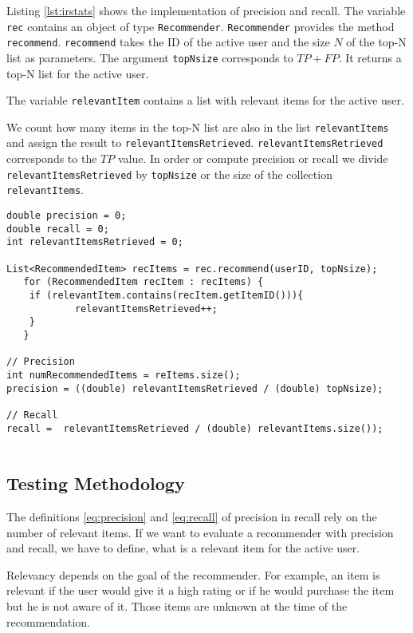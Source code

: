 Listing \ref{lst:irstats} shows the implementation of precision and recall. 
The variable \verb|rec| contains an object of type \verb|Recommender|. \verb|Recommender| provides the method \verb|recommend|. \verb|recommend| takes the ID of the active user and the size $N$ of the top-N list as parameters. The argument \verb|topNsize| corresponds to $TP+FP$. It returns a top-N list for the active user. 

The variable \verb|relevantItem| contains a list with relevant items for the active user.

We count how many items in the top-N list are also in the list \verb|relevantItems| and assign the result to \verb|relevantItemsRetrieved|. \verb|relevantItemsRetrieved| corresponds to the $TP$ value. In order or compute precision or recall we divide \verb|relevantItemsRetrieved| by \verb|topNsize| or the size of the collection\\ \verb|relevantItems|.


\begin{lstlisting}[caption=Implementation of precision and recall,label=lst:irstats]
double precision = 0;
double recall = 0;
int relevantItemsRetrieved = 0;

List<RecommendedItem> recItems = rec.recommend(userID, topNsize);
   for (RecommendedItem recItem : recItems) {
	if (relevantItem.contains(recItem.getItemID())){
			relevantItemsRetrieved++;
	}
   }

// Precision
int numRecommendedItems = reItems.size();
precision = ((double) relevantItemsRetrieved / (double) topNsize);
		      
// Recall
recall =  relevantItemsRetrieved / (double) relevantItems.size());
		      
\end{lstlisting}

\subsection{Testing Methodology}
\label{sec:methodology}
The definitions \ref{eq:precision} and \ref{eq:recall} of precision in recall rely on the number of relevant items.
If we want to evaluate a recommender with \gls{precision} and \gls{recall}, we have to define, what is a relevant item for the active user. 

Relevancy depends on the goal of the recommender. For example, an item is relevant if the user would give it a high rating or if he would purchase the item but he is not aware of it.
Those items are unknown at the time of the recommendation. 

